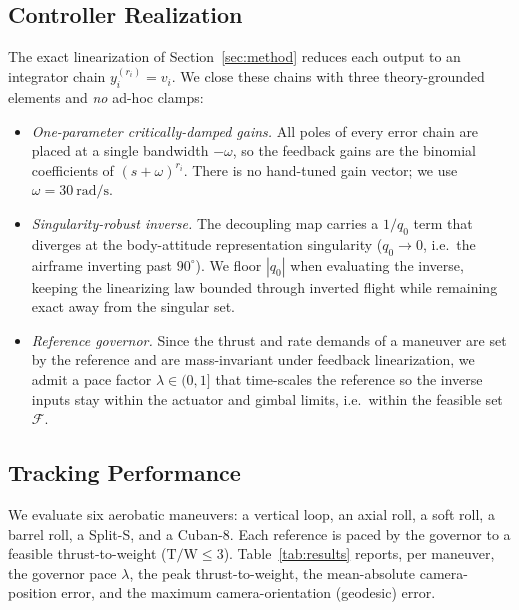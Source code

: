 \subsection{Controller Realization}
\label{ssec:realization}
The exact linearization of Section~\ref{sec:method} reduces each output to an integrator chain $y_i^{(r_i)} = v_i$. We close these chains with three theory-grounded elements and \emph{no} ad-hoc clamps:
\begin{itemize}[leftmargin=*]
\item \emph{One-parameter critically-damped gains.} All poles of every error chain are placed at a single bandwidth $-\omega$, so the feedback gains are the binomial coefficients of $(s+\omega)^{r_i}$. There is no hand-tuned gain vector; we use $\omega = \SI{30}{\radian\per\second}$.
\item \emph{Singularity-robust inverse.} The decoupling map carries a $1/q_0$ term that diverges at the body-attitude representation singularity ($q_0 \to 0$, i.e.\ the airframe inverting past $90^\circ$). We floor $|q_0|$ when evaluating the inverse, keeping the linearizing law bounded through inverted flight while remaining exact away from the singular set.
\item \emph{Reference governor.} Since the thrust and rate demands of a maneuver are set by the reference and are mass-invariant under feedback linearization, we admit a pace factor $\lambda \in (0,1]$ that time-scales the reference so the inverse inputs stay within the actuator and gimbal limits, i.e.\ within the feasible set~$\mathcal{F}$.
\end{itemize}

\subsection{Tracking Performance}
\label{ssec:tracking}
We evaluate six aerobatic maneuvers: a vertical loop, an axial roll, a soft roll, a barrel roll, a Split-S, and a Cuban-8. Each reference is paced by the governor to a feasible thrust-to-weight ($\text{T/W} \le 3$). Table~\ref{tab:results} reports, per maneuver, the governor pace $\lambda$, the peak thrust-to-weight, the mean-absolute camera-position error, and the maximum camera-orientation (geodesic) error.

